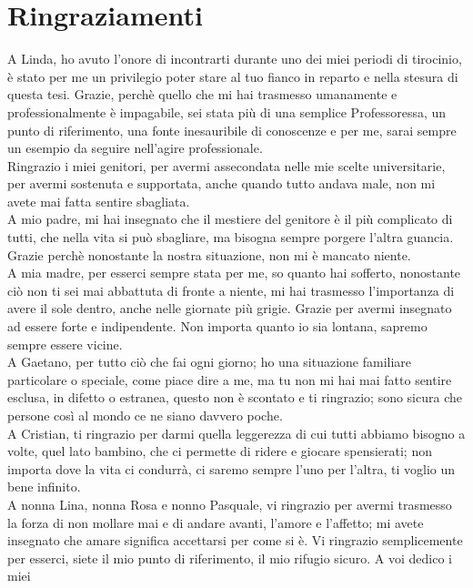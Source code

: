 \chapter*{Ringraziamenti}

A Linda, ho avuto l'onore di incontrarti durante uno dei miei periodi di tirocinio, è stato per me un privilegio poter
stare al tuo fianco in reparto e nella stesura di questa tesi. Grazie, perchè quello che mi hai trasmesso umanamente e
professionalmente è impagabile, sei stata più di una semplice Professoressa, un punto di riferimento,
una fonte inesauribile di conoscenze e per me, sarai sempre un esempio da seguire nell'agire professionale.\\
Ringrazio i miei genitori, per avermi assecondata nelle mie scelte universitarie, per avermi sostenuta e supportata,
anche quando tutto andava male, non mi avete mai fatta sentire sbagliata.\\
A mio padre, mi hai insegnato che il mestiere del genitore è il più complicato di tutti,
che nella vita si può sbagliare, ma bisogna sempre porgere l'altra guancia. Grazie perchè nonostante la nostra situazione,
non mi è mancato niente.\\
A mia madre, per esserci sempre stata per me, so quanto hai sofferto, nonostante ciò non ti sei mai abbattuta di fronte a 
niente, mi hai trasmesso l'importanza di avere il sole dentro, anche nelle giornate più grigie. 
Grazie per avermi insegnato ad essere forte e indipendente. Non importa quanto io sia lontana, sapremo sempre 
essere vicine.\\
A Gaetano, per tutto ciò che fai ogni giorno; ho una situazione familiare
particolare o speciale, come piace dire a me, ma tu non mi hai mai fatto sentire esclusa, in difetto o estranea,
questo non è scontato e ti ringrazio; sono sicura che persone così al mondo ce ne siano davvero poche.\\
A Cristian, ti ringrazio per darmi quella leggerezza di cui tutti abbiamo
bisogno a volte, quel lato bambino, che ci permette di ridere e giocare spensierati; non importa dove la vita ci condurrà, 
ci saremo sempre l'uno per l'altra, ti voglio un bene infinito.\\
A nonna Lina, nonna Rosa e nonno Pasquale, vi ringrazio per avermi trasmesso la forza di non mollare mai e di andare
avanti, l'amore e l'affetto; mi avete insegnato che amare significa accettarsi per come si è. Vi
ringrazio semplicemente per esserci, siete il mio punto di riferimento, il mio rifugio sicuro. A voi dedico i miei
